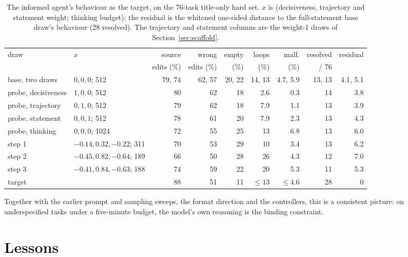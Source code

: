\documentclass[11pt]{article}
\begin{document}
\begin{table}[t]
\centering\footnotesize
\caption{The informed agent's behaviour as the target, on the 76-task title-only hard set. $x$ is (decisiveness, trajectory and statement weight; thinking budget); the residual is the whitened one-sided distance to the full-statement base draw's behaviour (28 resolved). The trajectory and statement columns are the weight-1 draws of Section~\ref{sec:scaffold}.}
\label{tab:informed}
\setlength{\tabcolsep}{3.5pt}
\begin{tabular}{llrrrrrrr}
\toprule
draw & $x$ & source & wrong & empty & loops & malf. & resolved & residual \\
 & & edits (\%) & edits (\%) & (\%) & (\%) & (\%) & / 76 & \\
\midrule
base, two draws & $0, 0, 0$; 512 & 79, 74 & 62, 57 & 20, 22 & 14, 13 & 4.7, 5.9 & 13, 13 & 4.1, 5.1 \\
probe, decisiveness & $1, 0, 0$; 512 & 80 & 62 & 18 & 2.6 & 0.3 & 14 & 3.8 \\
probe, trajectory & $0, 1, 0$; 512 & 79 & 62 & 18 & 7.9 & 1.1 & 13 & 3.9 \\
probe, statement & $0, 0, 1$; 512 & 78 & 61 & 20 & 7.9 & 2.3 & 13 & 4.3 \\
probe, thinking & $0, 0, 0$; 1024 & 72 & 55 & 25 & 13 & 6.8 & 13 & 6.0 \\
step 1 & $-0.14, 0.32, -0.22$; 311 & 70 & 53 & 29 & 10 & 3.4 & 13 & 6.2 \\
step 2 & $-0.45, 0.82, -0.64$; 189 & 66 & 50 & 28 & 26 & 4.3 & 12 & 7.0 \\
step 3 & $-0.41, 0.84, -0.63$; 188 & 74 & 59 & 22 & 20 & 5.3 & 11 & 5.3 \\
target & & 88 & 51 & 11 & $\le 13$ & $\le 4.6$ & 28 & 0 \\
\bottomrule
\end{tabular}
\end{table}

Together with the earlier prompt and sampling sweeps, the format direction and the controllers, this is a consistent picture: on underspecified tasks under a five-minute budget, the model's own reasoning is the binding constraint.

\section{Lessons}\label{sec:lessons}
\end{document}
